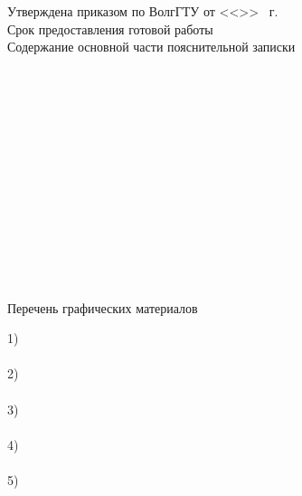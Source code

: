 \begin{titlepage}
    \vspace{0.5em}\hspace*{12mm}\underline{}\\
    \vspace{0.5em}\hspace*{12mm}\underline{\hspace{0.93\textwidth}}\\
    \vspace{1em}Утверждена приказом по ВолгГТУ от <<\LINE{1em}>> \underline{\hspace{4em}}
        \the\year\ г. \textnumero \LINE{7em}\\
    Срок предоставления готовой работы \\
    \vspace{0.5em}Содержание основной части пояснительной записки\\
    \LINE{\textwidth}\\\LINE{\textwidth}\\\LINE{\textwidth}\\\LINE{\textwidth}\\\LINE{\textwidth}\\
    \LINE{\textwidth}\\\LINE{\textwidth}\\\LINE{\textwidth}\\\LINE{\textwidth}\\\LINE{\textwidth}\\
    \LINE{\textwidth}\\\LINE{\textwidth}\\\LINE{\textwidth}\\
    \newpage
    \thispagestyle{empty}
    \begin{center}
        Перечень графических материалов
    \end{center}
    1) \\\LINE{\textwidth}\\
    2) \\\LINE{\textwidth}\\
    3) \\\LINE{\textwidth}\\
    4) \\\LINE{\textwidth}\\
    5) \\\LINE{\textwidth}\\

\end{titlepage}
